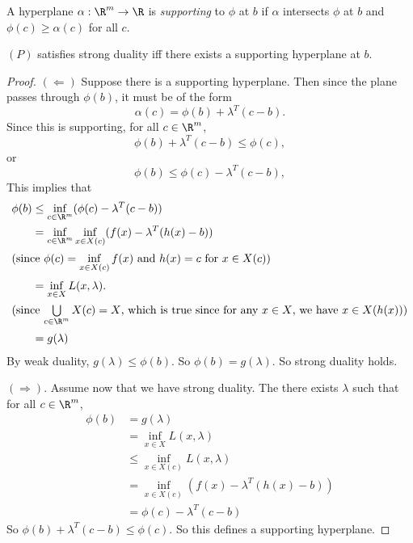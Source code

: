 \documentclass[a4paper]{article}
\begin{document}
\begin{defi}
  A hyperplane $\alpha: \R^m \to \R$ is \emph{supporting} to $\phi$ at $b$ if $\alpha$ intersects $\phi$ at $b$ and  $\phi(c) \geq \alpha(c)$ for all $c$.

  \begin{center}
  \end{center}
\end{defi}

\begin{thm}[]
  $(P)$ satisfies strong duality iff there exists a supporting hyperplane at $b$.
\end{thm}

\begin{proof}
  $(\Leftarrow)$ Suppose there is a supporting hyperplane. Then since the plane passes through $\phi(b)$, it must be of the form
  \[
    \alpha(c) = \phi(b) + \lambda^T(c - b).
  \]
  Since this is supporting, for all $c\in \R^m$,
  \[
    \phi(b) + \lambda^T(c - b) \leq \phi(c),
  \]
  or
  \[
    \phi(b) \leq \phi(c) - \lambda^T(c - b),
  \]
  This implies that
  \begin{align*}
    \phi(b) &\leq \inf_{c\in \R^m}(\phi(c) - \lambda^T(c - b))\\
    &= \inf_{c\in \R^m}\inf_{x\in X(c)}(f(x) - \lambda^T(h(x) - b))\\
    \intertext{(since $\phi(c) = \inf\limits_{x\in X(c)} f(x)$ and $h(x) = c$ for $x\in X(c)$)}
    &= \inf_{x\in X}L(x, \lambda).\\
    \intertext{(since $\bigcup\limits_{c\in \R^m}X(c) = X$, which is true since for any $x\in X$, we have $x\in X(h(x))$)}
    &= g(\lambda)
  \end{align*}
  By weak duality, $g(\lambda) \leq \phi(b)$. So $\phi(b) = g(\lambda)$. So strong duality holds.

  $(\Rightarrow)$. Assume now that we have strong duality. The there exists $\lambda$ such that for all $c\in \R^m$,
  \begin{align*}
    \phi(b) &= g(\lambda)\\
    &= \inf_{x\in X}L(x, \lambda)\\
    &\leq \inf_{x\in X(c)} L(x, \lambda)\\
    &= \inf_{x\in X(c)} (f(x) - \lambda^T(h(x) - b))\\
    &= \phi(c) - \lambda^T(c - b)
  \end{align*}
  So $\phi(b) + \lambda^T(c - b) \leq \phi(c)$. So this defines a supporting hyperplane.
\end{proof}
\end{document}
